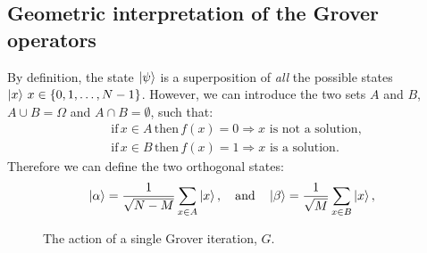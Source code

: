 \documentclass[a4paper,draft]{article}
\begin{document}
\subsection{Geometric interpretation of the Grover operators}
By definition, the state $\ket{\psi}$ is a superposition of \textit{all} the possible states $\ket{x}\, x\in\{0,1,\ldots,N-1\}$. However, we can introduce the two sets $A$ and $B$, $A\cup B = \Omega$ and $A\cap B=\emptyset$, such that:
\begin{align*}
  &\text{if}\,x\in A\,\text{then}\,f(x)=0
  \Rightarrow\text{$x$ is not a solution},\\
  &\text{if}\,x\in B\,\text{then}\,f(x)=1
  \Rightarrow\text{$x$ is a solution}.
\end{align*}
Therefore we can define the two orthogonal states:
\begin{align*}
  \ket{\alpha}=\frac{1}{\sqrt{N-M}}\sum_{x\in A}\ket{x},
  \quad\text{and}\quad
  \ket{\beta}=\frac{1}{\sqrt{M}}\sum_{x\in B}\ket{x},
\end{align*}
\begin{figure}[H]
	\centering
	
	\label{fig:Grover}
	\caption{The action of a single Grover iteration, $G$.}
\end{figure}

%
%
\end{document}
